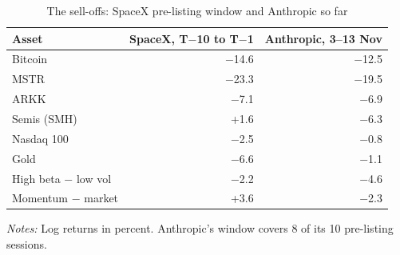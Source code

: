 \begin{table}[!htbp]\centering\footnotesize
\caption{The sell-offs: SpaceX pre-listing window and Anthropic so far}\label{tab:moves}

\begin{threeparttable}
\begin{tabular}{lrr}
\toprule
Asset & SpaceX, T$-$10 to T$-$1 & Anthropic, 3--13 Nov \\
\midrule
Bitcoin & $-$14.6 & $-$12.5 \\
MSTR & $-$23.3 & $-$19.5 \\
ARKK & $-$7.1 & $-$6.9 \\
Semis (SMH) & +1.6 & $-$6.3 \\
Nasdaq 100 & $-$2.5 & $-$0.8 \\
Gold & $-$6.6 & $-$1.1 \\
High beta $-$ low vol & $-$2.2 & $-$4.6 \\
Momentum $-$ market & +3.6 & $-$2.3 \\
\bottomrule
\end{tabular}
\begin{tablenotes}[flushleft]\footnotesize
\item \textit{Notes:} Log returns in percent. Anthropic's window covers 8 of its 10 pre-listing sessions.
\end{tablenotes}
\end{threeparttable}

\end{table}
